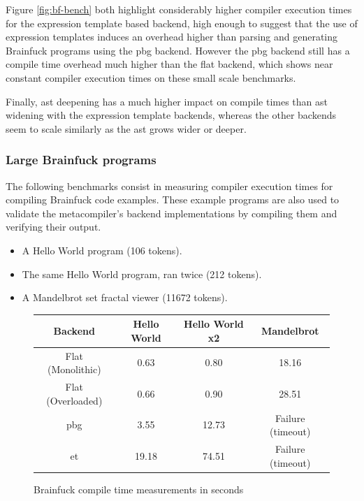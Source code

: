 \documentclass[../main]{subfiles}
\begin{document}
Figure \ref{fig:bf-bench}
both highlight considerably higher compiler execution times for the expression
template based backend, high enough to suggest that the use of expression
templates induces an overhead higher than parsing and generating Brainfuck
programs using the \gls{pbg} backend. However the \gls{pbg}
backend still has a compile time overhead much higher than the flat backend,
which shows near constant compiler execution times on these small scale
benchmarks.

Finally, \gls{ast} deepening has a much higher impact on compile times than \gls{ast}
widening with the expression template backends, whereas the other backends seem
to scale similarly as the \gls{ast} grows wider or deeper.

\subsubsection{
  Large Brainfuck programs
}
\label{lbl:bf-large-program-benches}

The following benchmarks consist in measuring compiler execution times for
compiling Brainfuck code examples. These example programs are also used to
validate the metacompiler's backend implementations by compiling them and
verifying their output.

\begin{itemize}
\item A Hello World program (106 tokens).
\item The same Hello World program, ran twice (212 tokens).
\item A Mandelbrot set fractal viewer (11672 tokens).
\end{itemize}

\begin{figure}
\begin{tabular}{|c|c|c|c|}
\hline
Backend           & Hello World & Hello World x2  & Mandelbrot \\
\hline
Flat (Monolithic) & 0.63        & 0.80            & 18.16 \\
Flat (Overloaded) & 0.66        & 0.90            & 28.51 \\
\gls{pbg}         & 3.55        & 12.73           & Failure (timeout) \\
\gls{et}          & 19.18       & 74.51           & Failure (timeout) \\
\hline
\end{tabular}
\caption{Brainfuck compile time measurements in seconds}
\label{fig:bf-compile-times}
\end{figure}
\end{document}
